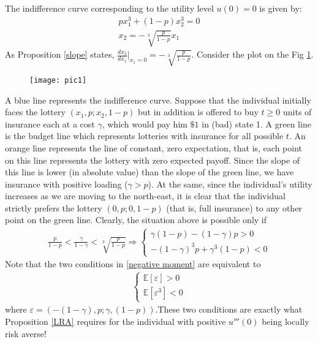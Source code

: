 \documentclass[a4paper]{article}
\newcommand{\expect}{\mathbb{E}}
\newcommand{\eps}{\varepsilon}
\begin{document}
The indifference curve corresponding to the utility level $u(0) = 0$ is given by:
\begin{align*}
	px_1^3 + (1-p)x_2^3 = 0\\
	x_2 = -\sqrt[3]{\frac{p}{1-p}} x_1
\end{align*}
As Proposition \ref{slope} states, $\frac{dx_2}{dx_1}\bigg|_{x_1=0} = -\sqrt[3]{\frac{p}{1-p}}$.
Consider the plot on the Fig \ref{fig1}. 
\begin{figure}[H]
	\centering
	\texttt{[image: pic1]}
	\caption{}\label{fig1}
\end{figure}

A blue line represents the indifference curve. Suppose that the individual initially faces the lottery $(x_1, p; x_2, 1-p)$ but in addition is offered to buy $t \ge 0$ units of insurance each at a cost $\gamma$, which would pay him $\$ 1$ in (bad) state 1. A green line is the budget line which represents lotteries with insurance for all possible $t$. An orange line represents the line of constant, zero expectation, that is, each point on this line represents the lottery with zero expected payoff. Since the slope of this line is lower (in absolute value) than the slope of the green line, we have insurance with positive loading ($\gamma > p$). At the same, since the individual's utility increases as we are moving to the north-east, it is clear that the individual strictly prefers the lottery $(0, p; 0, 1-p)$ (that is, full insurance) to any other point on the green line. Clearly, the situation above is possible only if 
\begin{align}\label{negative moment}
	\frac{p}{1-p} < \frac{\gamma}{1-\gamma}< \sqrt[3]{\frac{p}{1-p}} \Rightarrow \begin{cases}
		\gamma(1-p) - (1-\gamma)p > 0\\
		-(1-\gamma)^3p+\gamma^3(1-p)<0
		\end{cases}
\end{align}
Note that the two conditions in \eqref{negative moment} are equivalent to 
\begin{align*}
	\begin{cases}
			\expect[\eps] >0\\
	\expect[\eps^3] < 0
	\end{cases}
\end{align*}
where $\eps = (-(1-\gamma), p; \gamma, (1-p))$.These two conditions are exactly what Proposition \ref{LRA} requires for the individual with positive $u'''(0)$ being locally risk averse!
\end{document}
